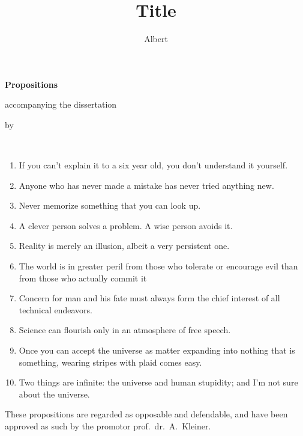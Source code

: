 \documentclass{_style/dissertation}
\title[Optional Subtitle]{Title}
\author{Albert}{Einstein}
\begin{document}
\begin{center}

    {\Huge\titlefont\bfseries Propositions}

    \bigskip

    accompanying the dissertation

    \bigskip

    {\makeatletter
        \color{title}
        \titlestyle\bfseries\huge\@title
        \makeatother}

    {\makeatletter
        \color{title}
        \ifx\@subtitle\undefined\else
            \large\titlefont\titleshape\@subtitle
        \fi
        \makeatother}

    \bigskip

    by

    \bigskip

    \makeatletter
    {\large\titlefont\bfseries\@firstnames\ \MakeUppercase{\titleshape\@lastname}}
    \makeatother

\end{center}

\bigskip
\bigskip

\begin{enumerate}

\item If you can't explain it to a six year old, you don't understand it yourself.

\item Anyone who has never made a mistake has never tried anything new.

\item Never memorize something that you can look up.

\item A clever person solves a problem. A wise person avoids it.

\item Reality is merely an illusion, albeit a very persistent one.

\item The world is in greater peril from those who tolerate or encourage evil than from those who actually commit it

\item Concern for man and his fate must always form the chief interest of all technical endeavors.

\item Science can flourish only in an atmosphere of free speech.

\item Once you can accept the universe as matter expanding into nothing that is something, wearing stripes with plaid comes easy.

\item Two things are infinite: the universe and human stupidity; and I'm not sure about the universe.

\end{enumerate}

\vfill

\begin{center}
These propositions are regarded as opposable and defendable, and have been approved as such by the promotor prof.\ dr.\ A.\ Kleiner.
\end{center}
\end{document}
